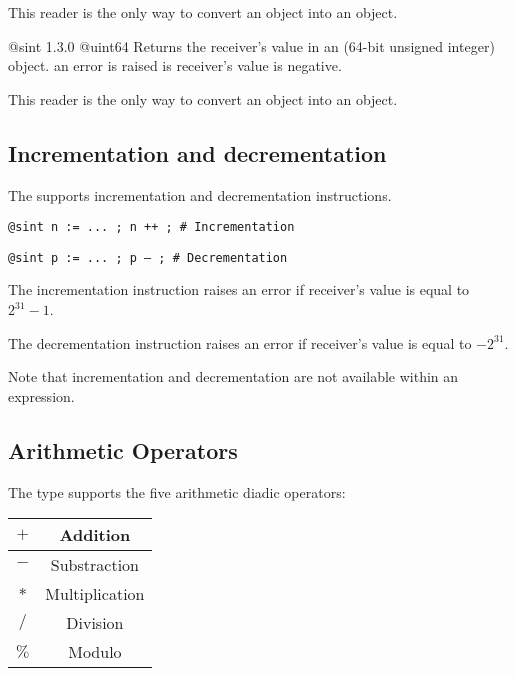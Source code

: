 This reader is the only way to convert an  object into an  object.




{@sint}
{1.3.0}
{@uint64}
{Returns the receiver's value in an  (64-bit unsigned integer) object.}
{an error is raised is receiver's value is negative.}

This reader is the only way to convert an  object into an  object.





\subsection{Incrementation and decrementation}

The  supports incrementation and decrementation instructions.

\texttt{@sint n := ... ; n ++ ; \# Incrementation}

\texttt{@sint p := ... ; p -- ; \# Decrementation}\newline

The incrementation instruction raises an error if receiver's value is equal to $2^{31}-1$.\newline

The decrementation instruction raises an error if receiver's value is equal to $-2^{31}$.\newline

Note that incrementation and decrementation are not available within an expression.




\subsection{Arithmetic Operators}

The  type supports the five arithmetic diadic operators:\newline

\begin{tabular}{|c|c|}
\hline
$+$ & Addition \\
\hline
$-$ & Substraction \\
\hline
$*$ & Multiplication \\
\hline
$/$ & Division \\
\hline
$\%$ & Modulo \\
\hline
\end{tabular}

